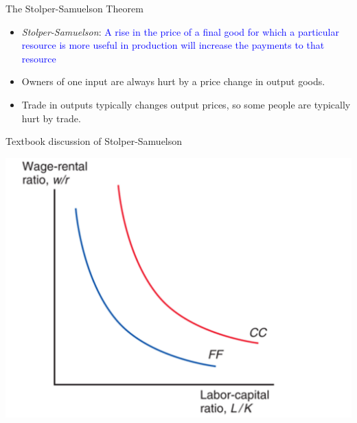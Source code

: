 \documentclass[ignorenonframetext,]{beamer}
\begin{document}
\begin{frame}{The Stolper-Samuelson Theorem}

    \begin{itemize}
            \item \emph{Stolper-Samuelson}: \textcolor{blue}{A rise in the price of a final good for which a particular resource is more useful in production will increase the payments to that resource}
            \item Owners of one input are always hurt by a price change in output goods.
            \item Trade in outputs typically changes output prices, so some people are typically hurt by trade.
    \end{itemize}

\end{frame}

\begin{frame}{Textbook discussion of Stolper-Samuelson}

    \includegraphics[scale=0.2]{relative_input_prices.png}

\end{frame}
\end{document}
